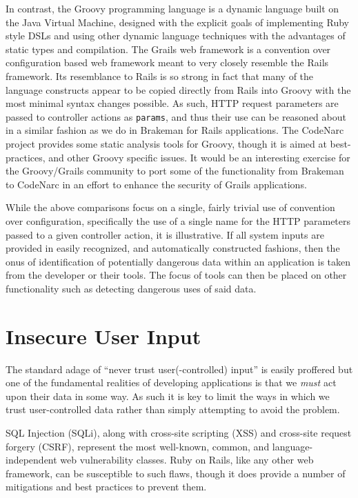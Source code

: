 \documentclass[conference]{IEEEtran}
\begin{document}
In contrast, the Groovy\cite{groovy} programming language is a dynamic language
built on the Java Virtual Machine, designed with the explicit goals of
implementing Ruby style DSLs and using other dynamic language techniques with
the advantages of static types and compilation.  The Grails\cite{grails} web
framework is a convention over configuration based web framework meant to very
closely resemble the Rails framework.  Its resemblance to Rails is so strong in
fact that many of the language constructs appear to be copied directly from
Rails into Groovy with the most minimal syntax changes possible.  As such, HTTP
request parameters are passed to controller actions as \texttt{params}, and thus
their use can be reasoned about in a similar fashion as we do in Brakeman for
Rails applications.  The CodeNarc\cite{codenarc} project provides some static
analysis tools for Groovy, though it is aimed at best-practices, and other
Groovy specific issues.  It would be an interesting exercise for the
Groovy/Grails community to port some of the functionality from Brakeman to
CodeNarc in an effort to enhance the security of Grails applications.

While the above comparisons focus on a single, fairly trivial use of convention
over configuration, specifically the use of a single name for the HTTP
parameters passed to a given controller action, it is illustrative.  If all
system inputs are provided in easily recognized, and automatically constructed
fashions, then the onus of identification of potentially dangerous data within
an application is taken from the developer or their tools.  The focus of tools
can then be placed on other functionality such as detecting dangerous uses of
said data.

\section{Insecure User Input}

The standard adage of ``never trust user(-controlled) input'' is easily
proffered but one of the fundamental realities of developing applications
is that we \emph{must} act upon their data in some way.  As such it is key to
limit the ways in which we trust user-controlled data rather than simply
attempting to avoid the problem.

SQL Injection (SQLi), along with cross-site scripting (XSS) and cross-site
request forgery (CSRF), represent the most well-known, common, and
language-independent web vulnerability classes.  Ruby on Rails, like any other
web framework, can be susceptible to such flaws, though it does provide a number
of mitigations and best practices to prevent them.
\end{document}
